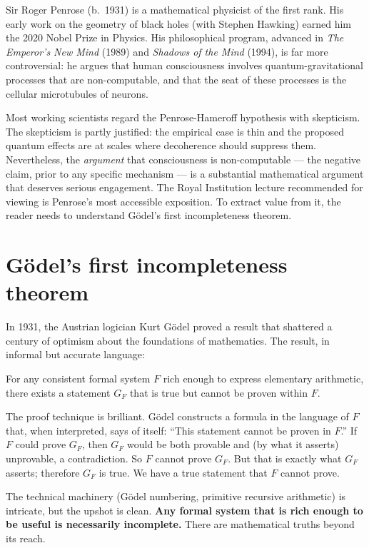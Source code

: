 \documentclass[11pt,a4paper]{book}
\theoremstyle{cleanrm}
\begin{document}
Sir Roger Penrose (b.\ 1931) is a mathematical physicist of the first
rank. His early work on the geometry of black holes (with Stephen
Hawking) earned him the 2020 Nobel Prize in Physics. His philosophical
program, advanced in \emph{The Emperor's New Mind} (1989) and
\emph{Shadows of the Mind} (1994), is far more controversial: he
argues that human consciousness involves quantum-gravitational
processes that are non-computable, and that the seat of these
processes is the cellular microtubules of neurons.

Most working scientists regard the Penrose-Hameroff hypothesis with
skepticism. The skepticism is partly justified: the empirical case
is thin and the proposed quantum effects are at scales where
decoherence should suppress them. Nevertheless, the \emph{argument}
that consciousness is non-computable --- the negative claim, prior to
any specific mechanism --- is a substantial mathematical argument
that deserves serious engagement. The Royal Institution lecture
recommended for viewing is Penrose's most accessible exposition. To
extract value from it, the reader needs to understand G\"odel's first
incompleteness theorem.

\section{G\"odel's first incompleteness theorem}

In 1931, the Austrian logician Kurt G\"odel proved a result that
shattered a century of optimism about the foundations of mathematics.
The result, in informal but accurate language:

\begin{conceptbox}
For any consistent formal system $F$ rich enough to express elementary
arithmetic, there exists a statement $G_F$ that is true but cannot be
proven within $F$.
\end{conceptbox}

The proof technique is brilliant. G\"odel constructs a formula in the
language of $F$ that, when interpreted, says of itself: ``This
statement cannot be proven in $F$.'' If $F$ could prove $G_F$, then
$G_F$ would be both provable and (by what it asserts) unprovable, a
contradiction. So $F$ cannot prove $G_F$. But that is exactly what
$G_F$ asserts; therefore $G_F$ is true. We have a true statement that
$F$ cannot prove.

The technical machinery (G\"odel numbering, primitive recursive
arithmetic) is intricate, but the upshot is clean. \textbf{Any
formal system that is rich enough to be useful is necessarily
incomplete.} There are mathematical truths beyond its reach.
\end{document}
